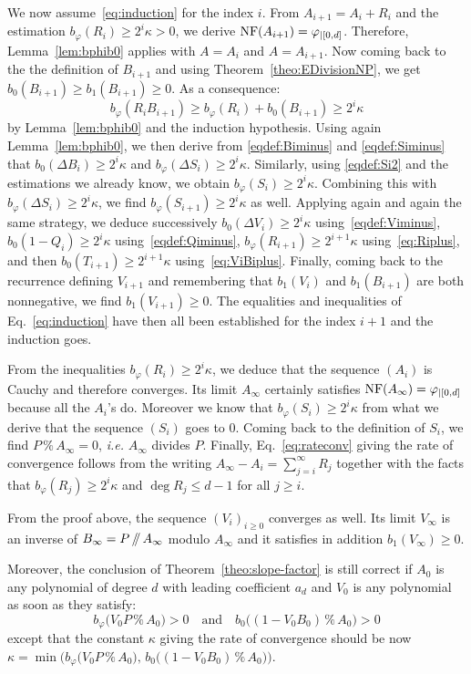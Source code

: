 \documentclass{sig-alternate-05-2015}
\newcommand{\NF}{\text{\rm NF}}
\renewcommand{\mod}{\,\%\,}
\renewcommand{\div}{\,/\hspace{-0.3em}/\,}
\begin{document}
We now assume~\eqref{eq:induction} for the index $i$.
From $A_{i+1} = A_i + R_i$ and the estimation $b_\varphi(R_i) \geq 2^i 
\kappa > 0$, we derive $\NF(A_{i+1}) = \varphi_{|[0,d]}$. Therefore,
Lemma~\ref{lem:bphib0} applies with $A = A_i$ and $A = A_{i+1}$.
Now coming back to the the definition of $B_{i+1}$ and using
Theorem~\ref{theo:EDivisionNP}, we get $b_0(B_{i+1}) \geq b_1(B_{i+1}) 
\geq 0$. As a consequence:
$$b_\varphi(R_i B_{i+1}) \geq b_\varphi(R_i) + b_0(B_{i+1})
\geq 2^i \kappa$$
by Lemma~\ref{lem:bphib0} and the induction hypothesis.
Using again Lemma~\ref{lem:bphib0}, we then derive from 
\eqref{eqdef:Biminus} and \eqref{eqdef:Siminus} that $b_0(\Delta B_i) \geq 
2^i \kappa$ and $b_\varphi(\Delta S_i) \geq 2^i \kappa$.
Similarly, using \eqref{eqdef:Si2} and the estimations we already know,
we obtain $b_\varphi(S_i) \geq 2^i \kappa$. Combining this with
$b_\varphi(\Delta S_i) \geq 2^i \kappa$, we find
$b_\varphi(S_{i+1}) \geq 2^i \kappa$ as well. Applying again and again
the same strategy, we deduce successively
$b_0(\Delta V_i) \geq 2^i \kappa$ using~\eqref{eqdef:Viminus},
$b_0(1{-}Q_i) \geq 2^i \kappa$ using~\eqref{eqdef:Qiminus},
$b_\varphi(R_{i+1}) \geq 2^{i+1} \kappa$ using~\eqref{eq:Riplus},
and then $b_0(T_{i+1}) \geq 2^{i+1} \kappa$
using~\eqref{eq:ViBiplus}. Finally, coming back to the recurrence
defining $V_{i+1}$ and remembering that $b_1(V_i)$ and $b_1(B_{i+1})$
are both nonnegative, we find $b_1(V_{i+1}) \geq 0$.
The equalities and inequalities
of Eq.~\eqref{eq:induction} have then all been established for
the index $i+1$ and the induction goes.

From the inequalities $b_\varphi(R_i) \geq 2^i \kappa$, we deduce that 
the sequence $(A_i)$ is Cauchy and therefore converges. Its limit 
$A_\infty$ certainly satisfies $\NF(A_\infty) = \varphi_{|[0,d]}$ because 
all the $A_i$'s do. Moreover we know that $b_\varphi(S_i) \geq 2^i 
\kappa$ from what we derive that the sequence $(S_i)$ goes to $0$.
Coming back to the definition of $S_i$, we find $P \mod A_\infty = 0$,
\emph{i.e.} $A_\infty$ divides $P$. Finally, Eq.~\eqref{eq:rateconv}
giving the rate of convergence follows from the writing
$A_\infty{-}A_i = \sum_{j=i}^\infty R_j$
together with the facts that $b_\varphi(R_j) \geq 2^i \kappa$ and $\deg 
R_j \leq d{-}1$ for all $j \geq i$.

\begin{rem}
\label{rem:slope-factor}
From the proof above, the sequence $(V_i)_{i \geq 0}$
converges as well. Its limit $V_\infty$ is an inverse of $B_\infty
= P \div A_\infty$ modulo $A_\infty$ and it satisfies in addition
$b_1(V_\infty) \geq 0$.

Moreover, the conclusion of 
Theorem~\ref{theo:slope-factor} is still correct if $A_0$ is any 
polynomial of degree $d$ with leading coefficient $a_d$ and $V_0$
is any polynomial as soon as they satisfy:
$$b_\varphi\big(V_0 P \mod A_0\big) > 0
\quad \text{and} \quad
b_0\big((1 - V_0 B_0) \mod A_0\big) > 0$$
except that the constant $\kappa$ giving the rate of convergence
should be now
$\kappa = \min \big( 
b_\varphi\big(V_0 P \mod A_0\big), \,
b_0\big((1 - V_0 B_0) \mod A_0\big)\big)$.
\end{rem}
\end{document}
